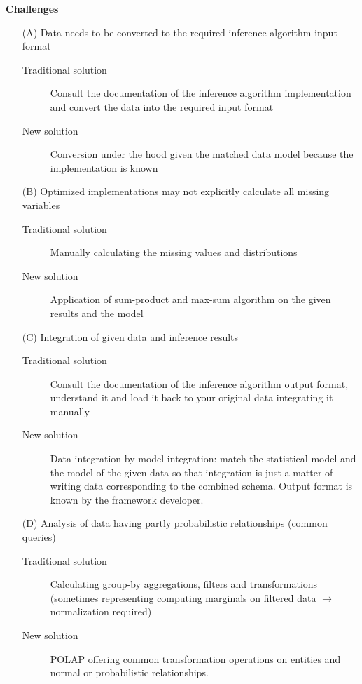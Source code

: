 \textbf{Challenges}
\begin{enumerate}
\item[(A)] Data needs to be converted to the required inference algorithm input format
	\begin{description}
	\item[Traditional solution] Consult the documentation of the inference algorithm implementation and convert the data into the required input format
	\item[New solution] Conversion under the hood given the matched data model because the implementation is known
	\end{description}
\item[(B)] Optimized implementations may not explicitly calculate all missing variables
	\begin{description}
	\item[Traditional solution] Manually calculating the missing values and distributions
	\item[New solution] Application of sum-product and max-sum algorithm on the given results and the model
	\end{description}
\item[(C)] Integration of given data and inference results
	\begin{description}
	\item[Traditional solution] Consult the documentation of the inference algorithm output format, understand it and load it back to your original data integrating it manually
	\item[New solution] Data integration by model integration: match the statistical model and the model of the given data so that integration is just a matter of writing data corresponding to the combined schema. Output format is known by the framework developer.
	\end{description}
\item[(D)] Analysis of data having partly probabilistic relationships (common queries)
	\begin{description}
	\item[Traditional solution] Calculating group-by aggregations, filters and transformations (sometimes representing computing marginals on filtered data $\rightarrow$ normalization required)
	\item[New solution] POLAP offering common transformation operations on entities and normal or probabilistic relationships.
	\end{description}
\end{enumerate}

